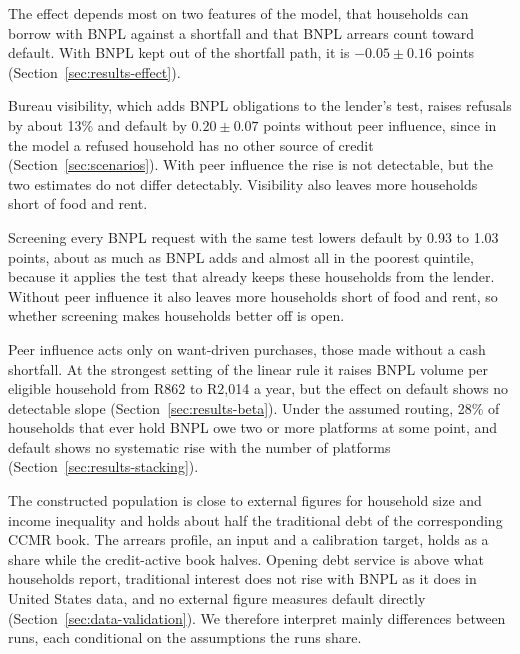 The effect depends most on two features of the model, that households can borrow with
\ac{BNPL} against a shortfall and that \ac{BNPL} arrears count toward default. With \ac{BNPL} kept
out of the shortfall path, it is $-0.05 \pm 0.16$ points (Section~\ref{sec:results-effect}).

Bureau visibility, which adds \ac{BNPL} obligations to the lender's test, raises refusals by
about 13\% and default by $0.20 \pm 0.07$ points without peer influence, since in the model a
refused household has no other source of credit (Section~\ref{sec:scenarios}). With peer influence
the rise is not detectable, but the two estimates do not differ detectably. Visibility also leaves
more households short of food and rent.

Screening every \ac{BNPL} request with the same test lowers default by 0.93 to 1.03 points, about as
much as \ac{BNPL} adds and almost all in the poorest quintile, because it applies the test that
already keeps these households from the lender. Without peer influence it also leaves more
households short of food and rent, so whether screening makes households better off is open.

Peer influence acts only on want-driven purchases, those made without a cash shortfall. At the
strongest setting of the linear rule it raises
\ac{BNPL} volume per eligible household from R862 to R2{,}014 a year, but the effect on default
shows no detectable slope (Section~\ref{sec:results-beta}). Under the assumed routing, 28\% of
households that ever hold \ac{BNPL} owe two or more platforms at some point, and default shows no systematic rise with
the number of platforms (Section~\ref{sec:results-stacking}).

The constructed population is close to external figures for household size and income inequality
and holds about half the
traditional debt of the corresponding \ac{CCMR} book. The arrears profile, an input and a
calibration target, holds as a share while the credit-active book halves. Opening debt service is above what households report, traditional
interest does not rise with \ac{BNPL} as it does in United States data, and no external figure
measures default directly (Section~\ref{sec:data-validation}). We therefore interpret mainly
differences between runs, each conditional on the assumptions the runs share.

